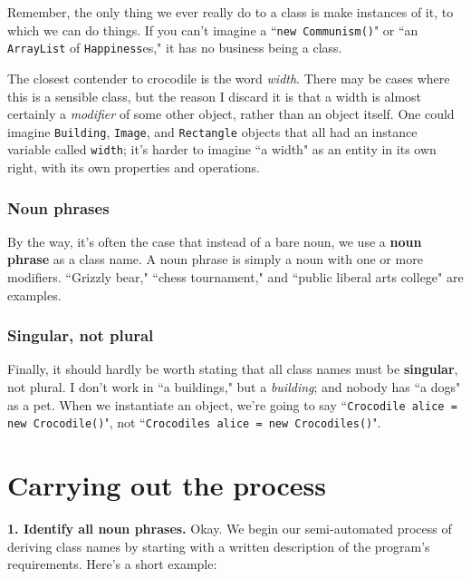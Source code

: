 Remember, the only thing we ever really do to a class is make instances of it,
to which we can do things. If you can't imagine a ``\texttt{new Communism()}"
or ``an \texttt{ArrayList} of \texttt{Happiness}es," it has no business being
a class.

The closest contender to crocodile is the word \textit{width}. There may be
cases where this is a sensible class, but the reason I discard it is that a
width is almost certainly a \textit{modifier} of some other object, rather
than an object itself. One could imagine \texttt{Building}, \texttt{Image},
and \texttt{Rectangle} objects that all had an instance variable called
\texttt{width}; it's harder to imagine ``a width" as an entity in its own
right, with its own properties and operations.

\subsubsection{Noun phrases}

By the way, it's often the case that instead of a bare noun, we use a
\textbf{noun phrase} as a class name. A noun phrase is simply a noun with one
or more modifiers. ``Grizzly bear," ``chess tournament," and ``public liberal
arts college" are examples.

\subsubsection{Singular, not plural}

Finally, it should hardly be worth stating that all class names must be
\textbf{singular}, not plural. I don't work in ``a buildings," but a
\textit{building}; and nobody has ``a dogs" as a pet. When we instantiate an
object, we're going to say ``\texttt{Crocodile alice = new Crocodile()}", not 
``\texttt{Crocodiles alice = new Crocodiles()}".

\section{Carrying out the process}

\textbf{1. Identify all noun phrases.} Okay. We begin our semi-automated
process of deriving class names by starting with a written description of the
program's requirements. Here's a short example:

\setlength{\fboxsep}{10pt}
\begin{center}
\large
{}
\end{center}

